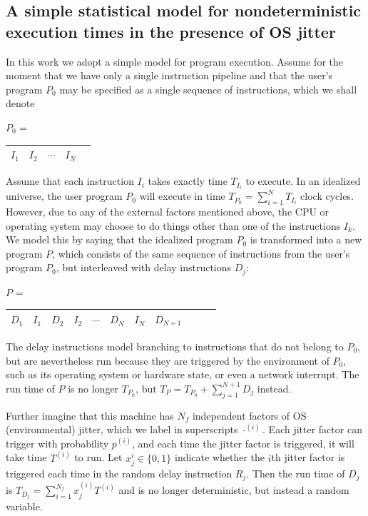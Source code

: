 \documentclass[conference]{IEEEtran}
\begin{document}
\label{sec:statmodel}
\subsection{A simple statistical model for nondeterministic execution times in the presence of OS jitter}

In this work we adopt a simple model for program execution. Assume for the moment that we have only a single instruction pipeline and that the user's program $P_0$ may be specified as a single sequence of instructions, which we shall denote

$P_0$ = \begin{tabular}{|c|c|c|c|c|}
\hline
$I_1$ & $I_2$ & $\cdots$ & $I_N$ \tabularnewline
\hline
\end{tabular}

Assume that each instruction $I_i$ takes exactly time $T_{I_i}$ to execute.
In an idealized universe, the user program $P_0$ will execute in time $T_{P_0} = \sum_{i=1}^N T_{I_i}$ clock cycles. However, due to any of the external factors mentioned above, the CPU or operating system may choose to do things other than one of the instructions $I_k$. We model this by saying that the idealized program $P_0$ is transformed into a new program $P$, which consists of the same sequence of instructions from the user's program $P_0$, but interleaved with delay instructions $D_j$:

$P$ = \begin{tabular}{|c|c|c|c|c|c|c|c|c|c|c|}
\hline
$D_1$ & $I_1$ & $D_2$ & $I_2$ &
$\cdots$ & $D_N$ & $I_N$ & $D_{N+1}$
\tabularnewline
\hline
\end{tabular}

The delay instructions model branching to instructions that do not belong to $P_0$, but are nevertheless run because they are triggered by the environment of $P_0$, such as its operating system or hardware state, or even a network interrupt. The run time of $P$ is no longer $T_{P_0}$, but
$T_P = T_{P_0} + \sum_{j=1}^{N+1} D_j$ instead.

Further imagine that this machine has $N_f$ independent factors of OS (environmental) jitter, which we label in superscripts $\cdot^{(i)}$. Each jitter factor can trigger with probability $p^{(i)}$, and each time the jitter factor is triggered, it will take time $T^{(i)}$ to run. Let $x^{i}_j \in \{0, 1\}$ indicate whether the $i$th jitter factor is triggered each time in the random delay instruction $R_j$. Then the run time of $D_j$ is
$T_{D_j} = \sum_{i=1}^{N_f} x^{(i)}_j T^{(i)}$ and is no longer deterministic, but instead a random variable.
\end{document}
